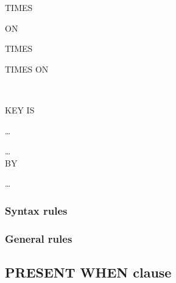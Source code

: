 \begin{syntax}
   \integer
  \begin{0-1}
     \integer
  \end{0-1}
  TIMES
  \begin{0-1}
     ON \identifier
  \end{0-1}
  \begin{0-1}
     \integer
  \end{0-1}
\end{syntax}

\begin{syntax}
   \integer TIMES
\end{syntax}

\begin{syntax}[\miscextcolour]
  \begin{0-1}
    \integer {}
  \end{0-1}
   TIMES  ON \identifier

  \begin{0+}
    \begin{1=}
      \begin{1=}
         \\
      \end{1=}
      KEY IS
      \begin{1=}
        \identifier
      \end{1=}\ldots
    \end{1=}\ldots \\

     BY
    \begin{1=}
      \cobolindexname
    \end{1=}\ldots
  \end{0+}
\end{syntax}

\subsubsection{Syntax rules}

\subsubsection{General rules}

\subsection{PRESENT WHEN clause}

